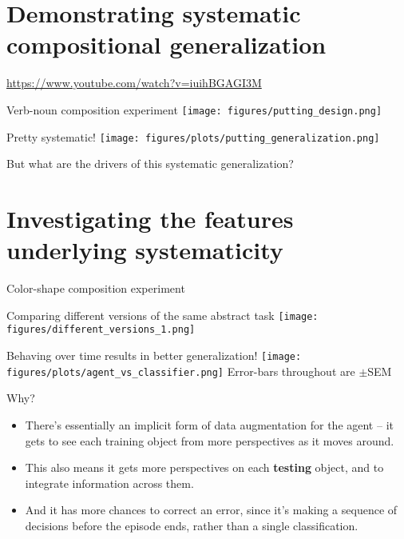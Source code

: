 \documentclass{beamer}
\begin{document}
\section{Demonstrating systematic compositional generalization}


\begin{frame}[standout]
\url{https://www.youtube.com/watch?v=iuihBGAGI3M}
\end{frame}

\begin{frame}{Verb-noun composition experiment}
\centering
\texttt{[image: figures/putting\_design.png]}
\end{frame}

\begin{frame}{Pretty systematic!}
\centering
\texttt{[image: figures/plots/putting\_generalization.png]}
\end{frame}

\begin{frame}[standout]
But what are the drivers of this systematic generalization?
\end{frame}

\section{Investigating the features underlying systematicity}

\begin{frame}{Color-shape composition experiment}
\centering
{}
\end{frame}

\begin{frame}{Comparing different versions of the same abstract task}
\centering
\texttt{[image: figures/different\_versions\_1.png]}
\end{frame}

\begin{frame}{Behaving over time results in better generalization!}
\texttt{[image: figures/plots/agent\_vs\_classifier.png]}
{\small Error-bars throughout are \(\pm\)SEM}
\end{frame}

\begin{frame}{Why?}
\begin{itemize}
\item There's essentially an implicit form of data augmentation for the agent -- it gets to see each training object from more perspectives as it moves around.
\item This also means it gets more perspectives on each \textbf{testing} object, and to integrate information across them.
\item And it has more chances to correct an error, since it's making a sequence of decisions before the episode ends, rather than a single classification. 
\end{itemize}
\end{frame}
\end{document}
